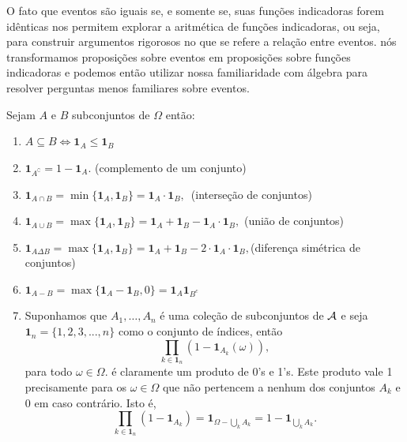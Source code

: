 \begin{frame}
\begin{nota}
	O fato que eventos são iguais se, e somente se, suas funções
indicadoras forem idênticas nos permitem explorar a aritmética de
funções indicadoras, ou seja,  para construir argumentos rigorosos no que se refere a relação entre
eventos. nós transformamos proposições sobre eventos em
proposições sobre funções indicadoras e podemos então utilizar nossa
familiaridade com álgebra para resolver perguntas menos familiares
sobre eventos.
\end{nota}

Sejam $A$ e $B$ subconjuntos de $\Omega$ então:
\begin{enumerate}
	\item $A\subseteq B \Leftrightarrow \mathbf{1}_A\leq \mathbf{1}_B$
	\item $\mathbf{1}_{A^\complement} = 1-\mathbf{1}_A.$ (complemento de um conjunto)
	
	\item $\mathbf{1}_{A\cap B} = \min\{\mathbf{1}_A,\mathbf{1}_B\} = \mathbf{1}_A \cdot\mathbf{1}_B,\,$ (interseção de conjuntos)
	\item $\mathbf{1}_{A\cup B} = \max\{{\mathbf{1}_A,\mathbf{1}_B}\} = \mathbf{1}_A + \mathbf{1}_B - \mathbf{1}_A \cdot\mathbf{1}_B,$ (união de conjuntos)
	\item $\mathbf{1}_{A\Delta B} = \max\{{\mathbf{1}_A,\mathbf{1}_B}\} = \mathbf{1}_A + \mathbf{1}_B - 2 \cdot \mathbf{1}_A \cdot\mathbf{1}_B, $(diferença simétrica de conjuntos)
	\item $\mathbf{1}_{A-B}=\max\{\mathbf{1}_A-\mathbf{1}_B,0\}=\mathbf{1}_A\mathbf{1}_{B^c}$
	\item Suponhamos que $A_1, \ldots, A_n$ é uma coleção de subconjuntos de $ {\cal A}  $ e seja $\mathbf{1}_n = \{1,2,3,...,n\}$ como o conjunto de índices, então
	$$ \prod_{k \in \mathbf{1}_n} ( 1 - \mathbf{1}_{A_k}(\omega)),$$  para todo $\omega \in \Omega. $
	é claramente um produto de 0's e 1's. Este produto vale 1 precisamente para os $\omega \in \Omega$ que não pertencem a nenhum dos conjuntos $A_k$ e 0 em caso contrário. Isto é,
	$$\prod_{k \in \mathbf{1}_n} ( 1 - \mathbf{1}_{A_k}) = \mathbf{1}_{\Omega - \bigcup_{k} A_k} = 1 - \mathbf{1}_{\bigcup_{k} A_k}.$$
\end{enumerate}
 
\end{frame}


